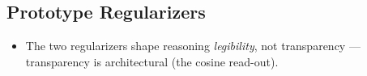\subsection{Prototype Regularizers}
\label{sec:bg-protomf-reg}
\begin{itemize}
    \item The two regularizers shape reasoning \emph{legibility}, not transparency — transparency is architectural (the cosine read-out). 

\end{itemize}
